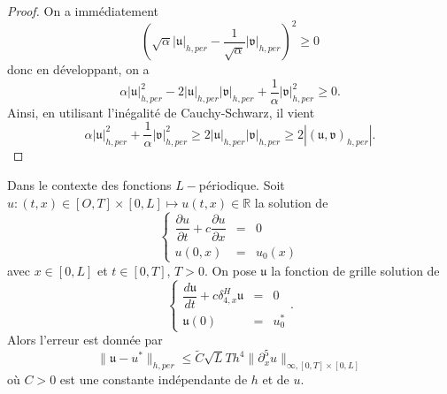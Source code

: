 \begin{proof}
On a immédiatement
\begin{equation}
\left( \sqrt{\alpha} |\mathfrak{u}|_{h,per} - \dfrac{1}{\sqrt{\alpha}} |\mathfrak{v}|_{h,per} \right)^2 \geq 0
\end{equation}
donc en développant, on a
\begin{equation}
\alpha |\mathfrak{u}|_{h,per}^2 - 2 |\mathfrak{u}|_{h,per} |\mathfrak{v}|_{h,per} + \dfrac{1}{\alpha} |\mathfrak{v}|_{h,per}^2 \geq 0.
\end{equation}
Ainsi, en utilisant l'inégalité de Cauchy-Schwarz, il vient
\begin{equation}
\alpha |\mathfrak{u}|_{h,per}^2 + \dfrac{1}{\alpha} |\mathfrak{v}|_{h,per}^2 \geq 2 |\mathfrak{u}|_{h,per} |\mathfrak{v}|_{h,per} \geq 2|(\mathfrak{u}, \mathfrak{v})_{h,per}|.
\end{equation}
\end{proof}







\begin{proposition}
Dans le contexte des fonctions $L-$périodique.
Soit $u : (t,x) \in [O, T] \times [0,L] \mapsto u(t,x) \in \mathbb{R}$ la solution de 
\begin{equation}
\left\lbrace
\begin{array}{rcl}
\dfrac{\partial u}{\partial t} + c \dfrac{\partial u}{\partial x} & = & 0\\
u(0,x) & = & u_0(x) 
\end{array}
\right.
\end{equation}
avec $x \in [0,L]$ et $t \in [0,T]$, $T>0$.
On pose $\mathfrak{u}$ la fonction de grille solution de 
\begin{equation}
\left\lbrace
\begin{array}{rcl}
\dfrac{d \mathfrak{u}}{dt} + c \delta_{4,x}^H \mathfrak{u} & = & 0\\
\mathfrak{u}(0) & = & u_0^* 
\end{array}
\right. .
\end{equation}
Alors l'erreur est donnée par
\begin{equation}
\| \mathfrak{u} - u^* \|_{h,per} \leq \tilde{C} \sqrt{L} T h^4 \| \partial^5_x u \|_{\infty,[0,T] \times [0,L]}
\end{equation}
où $C>0$ est une constante indépendante de $h$ et de $u$.
\end{proposition}

